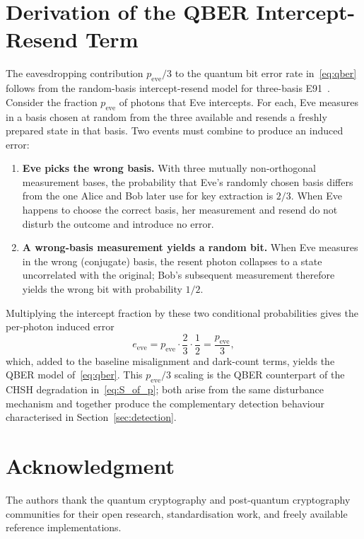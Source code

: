 \documentclass[conference]{IEEEtran}
\begin{document}
\section{Derivation of the QBER Intercept-Resend Term}
\label{app:qber}
The eavesdropping contribution $p_{\mathrm{eve}}/3$ to the quantum bit error rate in~\eqref{eq:qber} follows from the random-basis intercept-resend model for three-basis E91~\cite{fuchs1997,fung2006}. Consider the fraction $p_{\mathrm{eve}}$ of photons that Eve intercepts. For each, Eve measures in a basis chosen at random from the three available and resends a freshly prepared state in that basis. Two events must combine to produce an induced error:
\begin{enumerate}
\item \textbf{Eve picks the wrong basis.} With three mutually non-orthogonal measurement bases, the probability that Eve's randomly chosen basis differs from the one Alice and Bob later use for key extraction is $2/3$. When Eve happens to choose the correct basis, her measurement and resend do not disturb the outcome and introduce no error.
\item \textbf{A wrong-basis measurement yields a random bit.} When Eve measures in the wrong (conjugate) basis, the resent photon collapses to a state uncorrelated with the original; Bob's subsequent measurement therefore yields the wrong bit with probability $1/2$.
\end{enumerate}
Multiplying the intercept fraction by these two conditional probabilities gives the per-photon induced error
\begin{equation}
e_{\mathrm{eve}} = p_{\mathrm{eve}} \cdot \frac{2}{3} \cdot \frac{1}{2} = \frac{p_{\mathrm{eve}}}{3}, \label{eq:qber_deriv}
\end{equation}
which, added to the baseline misalignment and dark-count terms, yields the QBER model of~\eqref{eq:qber}. This $p_{\mathrm{eve}}/3$ scaling is the QBER counterpart of the CHSH degradation in~\eqref{eq:S_of_p}; both arise from the same disturbance mechanism and together produce the complementary detection behaviour characterised in Section~\ref{sec:detection}.

\section*{Acknowledgment}
The authors thank the quantum cryptography and post-quantum cryptography communities for their open research, standardisation work, and freely available reference implementations.
\end{document}
